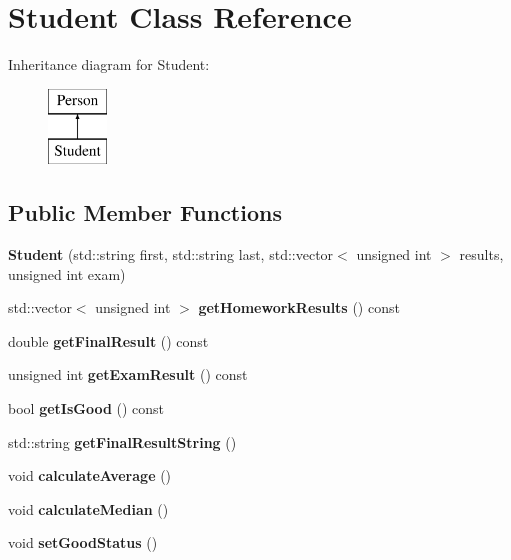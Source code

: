 \hypertarget{class_student}{}\section{Student Class Reference}
\label{class_student}
Inheritance diagram for Student\+:\begin{figure}[H]
\begin{center}
\leavevmode
\includegraphics[height=2.000000cm]{class_student}
\end{center}
\end{figure}
\subsection*{Public Member Functions}
\begin{DoxyCompactItemize}
\item 
\mbox{\label{class_student_a58c5240b99fa9db32b04e2a6e3fa862e}} 
{\bfseries Student} (std\+::string first, std\+::string last, std\+::vector$<$ unsigned int $>$ results, unsigned int exam)
\item 
\mbox{\label{class_student_acf11b0161a6f7ce3bb7c2f4867a9f23d}} 
std\+::vector$<$ unsigned int $>$ {\bfseries get\+Homework\+Results} () const
\item 
\mbox{\label{class_student_a38ef7b064b8e49a989a4b49741bc3919}} 
double {\bfseries get\+Final\+Result} () const
\item 
\mbox{\label{class_student_aa53975a5d6368b67db59509d193bfb7b}} 
unsigned int {\bfseries get\+Exam\+Result} () const
\item 
\mbox{\label{class_student_a6f1645da02cf41022ec7cf8bb8cfdf27}} 
bool {\bfseries get\+Is\+Good} () const
\item 
\mbox{\label{class_student_ae75d2e30f2037687ea646903ab73fb7d}} 
std\+::string {\bfseries get\+Final\+Result\+String} ()
\item 
\mbox{\label{class_student_a1dec1372297b03b74868ac35f29558df}} 
void {\bfseries calculate\+Average} ()
\item 
\mbox{\label{class_student_a9a4ac80e7bec0ec0eacb6b2af8369641}} 
void {\bfseries calculate\+Median} ()
\item 
\mbox{\label{class_student_acb65379cdccedbdfb16ef95eeb850214}} 
void {\bfseries set\+Good\+Status} ()
\end{DoxyCompactItemize}
